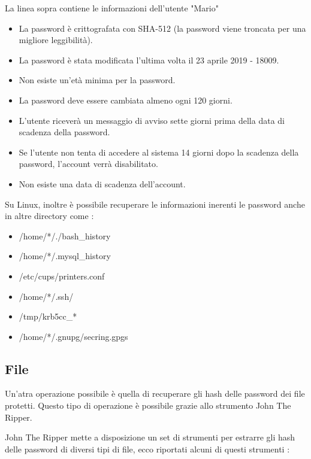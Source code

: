 La linea sopra contiene le informazioni dell'utente "Mario"

\begin{itemize}
    \item La password è crittografata con SHA-512 (la password viene troncata per una migliore leggibilità).
    \item La password è stata modificata l'ultima volta il 23 aprile 2019 - 18009.
    \item Non esiste un'età minima per la password.
    \item La password deve essere cambiata almeno ogni 120 giorni.
    \item L'utente riceverà un messaggio di avviso sette giorni prima della data di scadenza della password.
    \item Se l'utente non tenta di accedere al sistema 14 giorni dopo la scadenza della password, l'account verrà disabilitato.
    \item Non esiste una data di scadenza dell'account.
\end{itemize}

Su Linux, inoltre è possibile recuperare le informazioni inerenti le password anche in altre directory come :

\begin{itemize}
    \item /home/*/./bash\_history
    \item /home/*/.mysql\_history
    \item /etc/cups/printers.conf
    \item /home/*/.ssh/
    \item /tmp/krb5cc\_*
    \item /home/*/.gnupg/secring.gpgs
\end{itemize}

\subsection{File}

Un'atra operazione possibile è quella di recuperare gli hash delle password dei file protetti. Questo tipo di operazione è possibile grazie allo strumento John The Ripper.

John The Ripper mette a disposizione un set di strumenti per estrarre gli hash delle password di diversi tipi di file, ecco riportati alcuni di questi strumenti :


